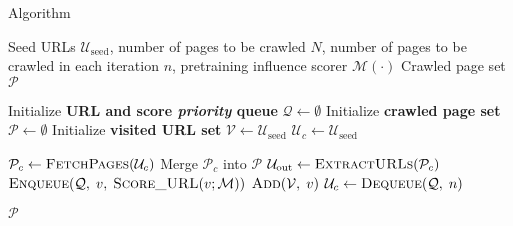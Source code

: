 \begin{algorithm}[!tb]
\small
\caption{\ours{} Algorithm}
\label{algo:crawl}
\begin{algorithmic}[1]
    \REQUIRE Seed URLs $\mathcal{U}_{\mathrm{seed}}$, number of pages to be crawled $N$, number of pages to be crawled in each iteration $n$, pretraining influence scorer $\mathcal{M}(\cdot)$
    \ENSURE Crawled page set $\mathcal{P}$

    \STATE Initialize \textbf{URL and score \textit{priority} queue} $\mathcal{Q} \gets \emptyset$
    \STATE Initialize \textbf{crawled page set} $\mathcal{P} \gets \emptyset$
    \STATE Initialize \textbf{visited URL set} $\mathcal{V} \gets \mathcal{U}_{\mathrm{seed}}$
    \STATE $\mathcal{U}_c \gets \mathcal{U}_{\mathrm{seed}}$

        \STATE $\mathcal{P}_c \gets \textsc{FetchPages}(\mathcal{U}_c)$ 
        \STATE Merge $\mathcal{P}_c$ into $\mathcal{P}$
        \STATE $\mathcal{U}_{\mathrm{out}} \gets \textsc{ExtractURLs}(\mathcal{P}_c)$ 
                \STATE $\textsc{Enqueue}(\mathcal{Q},\; v, \;\textsc{Score\_URL}(v;\mathcal{M}))$ \label{line:score}
                \STATE $\textsc{Add}(\mathcal{V},\; v)$
            \ENDIF
        \ENDFOR
        \STATE $\mathcal{U}_c \gets \textsc{Dequeue}(\mathcal{Q},\; n)$
    \ENDWHILE

    \RETURN $\mathcal{P}$
\end{algorithmic}
\end{algorithm}